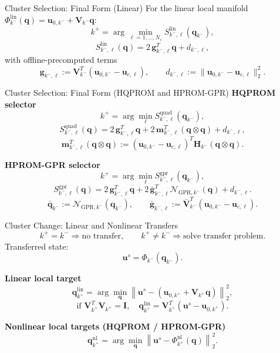 \documentclass[aspectratio=169]{beamer}
\begin{document}
{\begin{frame}{Cluster Selection: Final Form (Linear)}
\vspace{0.2em}
For the linear local manifold $\Phi_{k^-}^{\mathrm{lin}}(\mathbf q)=\mathbf u_{0,k^-}+\mathbf V_{k^-}\mathbf q$:
\[
k^+=\arg\min_{\ell=1,\dots,N_c} S_{k^-,\ell}^{\mathrm{lin}}(\mathbf q_{k^-}),
\]
\[
S_{k^-,\ell}^{\mathrm{lin}}(\mathbf q)
=
2\,\mathbf g_{k^-,\ell}^T\mathbf q + d_{k^-,\ell},
\]
with offline-precomputed terms
\[
\mathbf g_{k^-,\ell}
:=
\mathbf V_{k^-}^T(\mathbf u_{0,k^-}-\mathbf u_{c,\ell}),
\qquad
d_{k^-,\ell}
:=
\|\mathbf u_{0,k^-}-\mathbf u_{c,\ell}\|_2^2.
\]
\end{frame}

\begin{frame}{Cluster Selection: Final Form (HQPROM and HPROM-GPR)}
\scriptsize
\textbf{HQPROM selector}
\[
k^+=\arg\min_{\ell} S_{k^-,\ell}^{\mathrm{quad}}(\mathbf q_{k^-}),
\]
\[
S_{k^-,\ell}^{\mathrm{quad}}(\mathbf q)
=
2\,\mathbf g_{k^-,\ell}^T\mathbf q
+
2\,\mathbf m_{k^-,\ell}^T(\mathbf q\otimes\mathbf q)
+
d_{k^-,\ell},
\]
\[
\mathbf m_{k^-,\ell}^T(\mathbf q\otimes\mathbf q)
:=
(\mathbf u_{0,k^-}-\mathbf u_{c,\ell})^T\mathbf H_{k^-}(\mathbf q\otimes\mathbf q).
\]

\vspace{0.35em}
\textbf{HPROM-GPR selector}
\[
k^+=\arg\min_{\ell} S_{k^-,\ell}^{\mathrm{gpr}}(\mathbf q_{k^-}),
\]
\[
S_{k^-,\ell}^{\mathrm{gpr}}(\mathbf q)
=
2\,\mathbf g_{k^-,\ell}^T\mathbf q
+
2\,\bar{\mathbf g}_{k^-,\ell}^T\mathcal N_{\mathrm{GPR},k^-}(\mathbf q)
+
d_{k^-,\ell}.
\]
\[
\bar{\mathbf q}_{k^-}:=\mathcal N_{\mathrm{GPR},k^-}(\mathbf q_{k^-}),
\qquad
\bar{\mathbf g}_{k^-,\ell}:=\bar{\mathbf V}_{k^-}^T(\mathbf u_{0,k^-}-\mathbf u_{c,\ell}).
\]
\end{frame}

\begin{frame}{Cluster Change: Linear and Nonlinear Transfers}
\scriptsize
\[
k^+=k^- \Rightarrow \text{no transfer},
\qquad
k^+\neq k^- \Rightarrow \text{solve transfer problem}.
\]
Transferred state:
\[
\mathbf u^s=\Phi_{k^-}(\mathbf q_{k^-}).
\]

\textbf{Linear local target}
\[
\mathbf q_{k^+}^{\mathrm{lin}}
=\arg\min_{\mathbf q}
\left\|
\mathbf u^s-\left(\mathbf u_{0,k^+}+\mathbf V_{k^+}\mathbf q\right)
\right\|_2^2,
\]
\[
\text{if }\mathbf V_{k^+}^T\mathbf V_{k^+}=\mathbf I,\quad
\mathbf q_{k^+}^{\mathrm{lin}}=\mathbf V_{k^+}^T(\mathbf u^s-\mathbf u_{0,k^+}).
\]

\textbf{Nonlinear local targets (HQPROM / HPROM-GPR)}
\[
\mathbf q_{k^+}^{\mathrm{nl}}
=\arg\min_{\mathbf q}
\left\|\mathbf u^s-\Phi_{k^+}^{\mathrm{nl}}(\mathbf q)\right\|_2^2.
\]
\end{frame}

}
\end{document}
